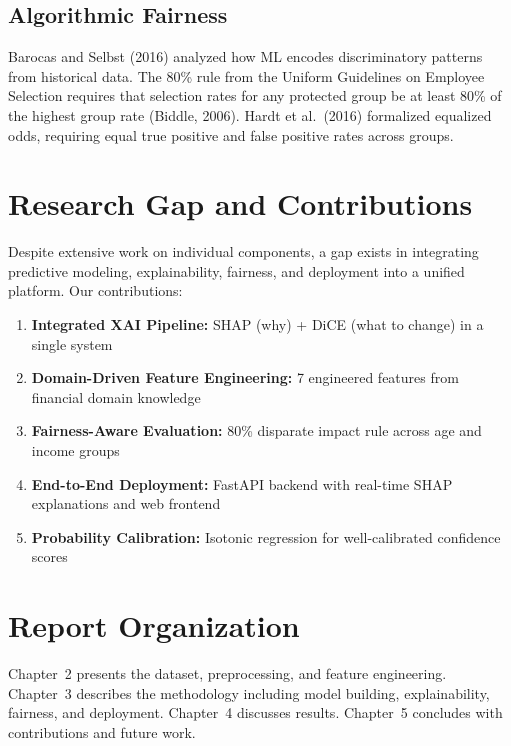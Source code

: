 \documentclass[12pt]{report}
\begin{document}
\subsection{Algorithmic Fairness}

Barocas and Selbst (2016) analyzed how ML encodes discriminatory patterns from historical data. The 80\% rule from the Uniform Guidelines on Employee Selection requires that selection rates for any protected group be at least 80\% of the highest group rate (Biddle, 2006). Hardt et al.\ (2016) formalized equalized odds, requiring equal true positive and false positive rates across groups.

\section{Research Gap and Contributions}

Despite extensive work on individual components, a gap exists in integrating predictive modeling, explainability, fairness, and deployment into a unified platform. Our contributions:

\begin{enumerate}[nosep]
    \item \textbf{Integrated XAI Pipeline:} SHAP (why) + DiCE (what to change) in a single system
    \item \textbf{Domain-Driven Feature Engineering:} 7 engineered features from financial domain knowledge
    \item \textbf{Fairness-Aware Evaluation:} 80\% disparate impact rule across age and income groups
    \item \textbf{End-to-End Deployment:} FastAPI backend with real-time SHAP explanations and web frontend
    \item \textbf{Probability Calibration:} Isotonic regression for well-calibrated confidence scores
\end{enumerate}

\section{Report Organization}

Chapter~2 presents the dataset, preprocessing, and feature engineering. Chapter~3 describes the methodology including model building, explainability, fairness, and deployment. Chapter~4 discusses results. Chapter~5 concludes with contributions and future work.


\end{document}

